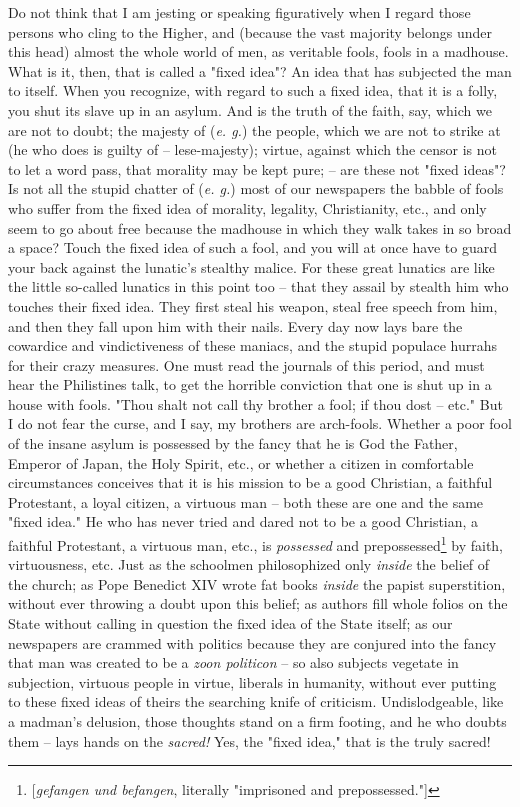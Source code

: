 \documentclass[a4paper]{book}
\begin{document}
Do not think that I am jesting or speaking figuratively when I regard those 
persons who cling to the Higher, and (because the vast majority belongs under 
this head) almost the whole world of men, as veritable fools, fools in a 
madhouse. What is it, then, that is called a "{}fixed idea"{}? An idea that 
has subjected the man to itself. When you recognize, with regard to such a 
fixed idea, that it is a folly, you shut its slave up in an asylum. And is the 
truth of the faith, say, which we are not to doubt; the majesty of (\textit{e. 
g.}) the people, which we are not to strike at (he who does is guilty of -- 
lese-majesty); virtue, against which the censor is not to let a word pass, 
that morality may be kept pure; -- are these not "{}fixed ideas"{}? Is not all 
the stupid chatter of (\textit{e. g.}) most of our newspapers the babble of 
fools who suffer from the fixed idea of morality, legality, Christianity, 
etc., and only seem to go about free because the madhouse in which they walk 
takes in so broad a space? Touch the fixed idea of such a fool, and you will 
at once have to guard your back against the lunatic's stealthy malice. For 
these great lunatics are like the little so-called lunatics in this point too 
-- that they assail by stealth him who touches their fixed idea. They first 
steal his weapon, steal free speech from him, and then they fall upon him with 
their nails. Every day now lays bare the cowardice and vindictiveness of these 
maniacs, and the stupid populace hurrahs for their crazy measures. One must 
read the journals of this period, and must hear the Philistines talk, to get 
the horrible conviction that one is shut up in a house with fools. "{}Thou 
shalt not call thy brother a fool; if thou dost -- etc."{} But I do not fear 
the curse, and I say, my brothers are arch-fools. Whether a poor fool of the 
insane asylum is possessed by the fancy that he is God the Father, Emperor of 
Japan, the Holy Spirit, etc., or whether a citizen in comfortable 
circumstances conceives that it is his mission to be a good Christian, a 
faithful Protestant, a loyal citizen, a virtuous man -- both these are one and 
the same "{}fixed idea."{} He who has never tried and dared not to be a good 
Christian, a faithful Protestant, a virtuous man, etc., is \textit{possessed} 
and prepossessed\footnote{[\textit{gefangen und befangen}, literally 
"{}imprisoned and prepossessed."{}]} by faith, virtuousness, etc. Just as the 
schoolmen philosophized only \textit{inside} the belief of the church; as Pope 
Benedict XIV wrote fat books \textit{inside} the papist superstition, without 
ever throwing a doubt upon this belief; as authors fill whole folios on the 
State without calling in question the fixed idea of the State itself; as our 
newspapers are crammed with politics because they are conjured into the fancy 
that man was created to be a \textit{zoon politicon} -- so also subjects 
vegetate in subjection, virtuous people in virtue, liberals in humanity, 
without ever putting to these fixed ideas of theirs the searching knife of 
criticism. Undislodgeable, like a madman's delusion, those thoughts stand on a 
firm footing, and he who doubts them -- lays hands on the \textit{sacred!} 
Yes, the "{}fixed idea,"{} that is the truly sacred!
\end{document}
